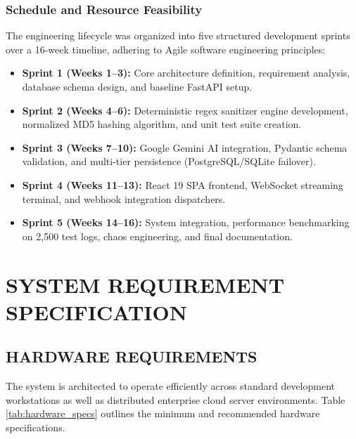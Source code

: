 \documentclass[12pt,a4paper]{article}
\begin{document}
\subsubsection{Schedule and Resource Feasibility}
The engineering lifecycle was organized into five structured development sprints over a 16-week timeline, adhering to Agile software engineering principles:
\begin{itemize}[leftmargin=1.2em,itemsep=3pt]
    \item \textbf{Sprint 1 (Weeks 1--3):} Core architecture definition, requirement analysis, database schema design, and baseline FastAPI setup.
    \item \textbf{Sprint 2 (Weeks 4--6):} Deterministic regex sanitizer engine development, normalized MD5 hashing algorithm, and unit test suite creation.
    \item \textbf{Sprint 3 (Weeks 7--10):} Google Gemini AI integration, Pydantic schema validation, and multi-tier persistence (PostgreSQL/SQLite failover).
    \item \textbf{Sprint 4 (Weeks 11--13):} React 19 SPA frontend, WebSocket streaming terminal, and webhook integration dispatchers.
    \item \textbf{Sprint 5 (Weeks 14--16):} System integration, performance benchmarking on 2,500 test logs, chaos engineering, and final documentation.
\end{itemize}

\clearpage
\section{SYSTEM REQUIREMENT SPECIFICATION}\label{sec:srs}

\subsection{HARDWARE REQUIREMENTS}\label{sec:hardware_req}
The system is architected to operate efficiently across standard development workstations as well as distributed enterprise cloud server environments. Table \ref{tab:hardware_specs} outlines the minimum and recommended hardware specifications.
\end{document}

